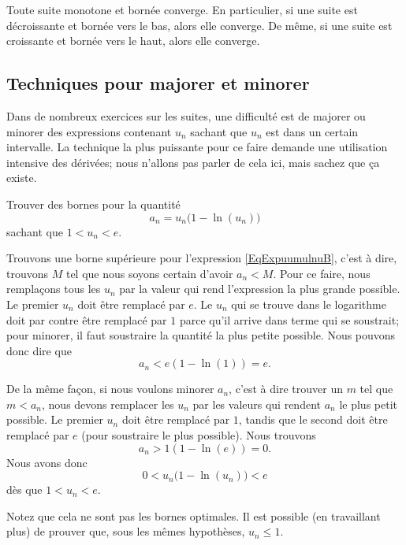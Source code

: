 \begin{proposition}		\label{Propsuiteborncv}
Toute suite monotone et bornée converge. En particulier, si une suite est décroissante et bornée vers le bas, alors elle converge. De même, si une suite est  croissante et bornée vers le haut, alors elle converge.
\end{proposition}

\subsection{Techniques pour majorer et minorer}

Dans de nombreux exercices sur les suites, une difficulté est de majorer ou minorer des expressions contenant $u_n$ sachant que $u_n$ est dans un certain intervalle. La technique la plus puissante pour ce faire demande une utilisation intensive des dérivées; nous n'allons pas parler de cela ici, mais sachez que ça existe.

\begin{example}
	Trouver	des bornes pour la quantité
	\begin{equation}		\label{EqExpuumulnuB}
		a_n=u_n\big( 1-\ln(u_n) \big)
	\end{equation}
	sachant que $1<u_n<e$.

	Trouvons une borne supérieure pour l'expression \eqref{EqExpuumulnuB}, c'est à dire, trouvons $M$ tel que nous soyons certain d'avoir $a_n<M$. Pour ce faire, nous remplaçons tous les $u_n$ par la valeur qui rend l'expression la plus grande possible. Le premier $u_n$ doit être remplacé par $e$. Le $u_n$ qui se trouve dans le logarithme doit par contre être remplacé par $1$ parce qu'il arrive dans terme qui se soustrait; pour minorer, il faut soustraire la quantité la plus petite possible. Nous pouvons donc dire que
	\begin{equation}
		a_n<e(1-\ln(1))=e.
	\end{equation}

	De la même façon, si nous voulons minorer $a_n$, c'est à dire trouver un $m$ tel que $m<a_n$, nous devons remplacer les $u_n$ par les valeurs qui rendent $a_n$ le plus petit possible. Le premier $u_n$ doit être remplacé par $1$, tandis que le second doit être remplacé par $e$ (pour soustraire le plus possible). Nous trouvons
	\begin{equation}
		a_n>1(1-\ln(e))=0.
	\end{equation}
	Nous avons donc
	\begin{equation}
		0<u_n\big( 1-\ln(u_n) \big)<e
	\end{equation}
	dès que $1<u_n<e$.

	Notez que cela ne sont pas les bornes optimales. Il est possible (en travaillant plus) de prouver que, sous les mêmes hypothèses, $u_n\leq 1$.
\end{example}
